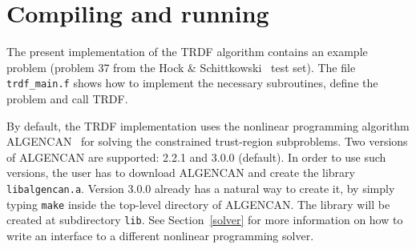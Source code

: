 \documentclass[12pt]{article}
\begin{document}

\section{Compiling and running}
\label{running}

The present implementation of the TRDF algorithm contains an example
problem (problem 37 from the Hock \& Schittkowski~\cite{hs} test
set). The file \texttt{trdf\_main.f} shows how to implement the
necessary subroutines, define the problem and call TRDF.

By default, the TRDF implementation uses the nonlinear programming
algorithm ALGENCAN~\cite{algencan,tango} for solving the constrained
trust-region subproblems. Two versions of ALGENCAN are supported:
2.2.1 and 3.0.0 (default). In order to use such versions, the user has
to download ALGENCAN and create the library
\texttt{libalgencan.a}. Version 3.0.0 already has a natural way to
create it, by simply typing \texttt{make} inside the top-level
directory of ALGENCAN. The library will be created at subdirectory
\texttt{lib}. See Section~\ref{solver} for more information on how to
write an interface to a different nonlinear programming solver.
\end{document}
